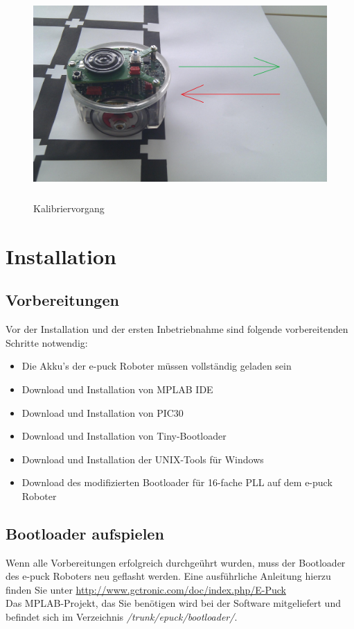 \documentclass[10pt,a4paper]{article}
\let\oldsection\section
\renewcommand{\section}{\newpage \oldsection}
\begin{document}
		\vspace{30pt}
		 \begin{figure}[htbp]
			\includegraphics[height=8cm]{images/puck3klein} 
			\caption{Kalibriervorgang}
			\label{kalibrierabbildung}
		\end{figure}
\section{Installation}
			\subsection{Vorbereitungen} 
			Vor der Installation und der ersten Inbetriebnahme sind folgende vorbereitenden Schritte notwendig:
			\begin{itemize}
				\item{Die Akku's der e-puck Roboter m\"ussen vollst\"andig geladen sein}
				\item{Download und Installation von MPLAB IDE}
				\item{Download und Installation von PIC30}
				\item{Download und Installation von Tiny-Bootloader}
				\item{Download und Installation der UNIX-Tools f\"ur Windows}
				\item{Download des modifizierten Bootloader f\"ur 16-fache PLL auf dem e-puck Roboter}
			\end{itemize}
			\subsection{Bootloader aufspielen} 
				Wenn alle Vorbereitungen erfolgreich durchge\"uhrt wurden, muss der Bootloader des e-puck Roboters neu geflasht werden. Eine ausf\"uhrliche
				Anleitung hierzu finden Sie unter \url{http://www.gctronic.com/doc/index.php/E-Puck} \\
				Das MPLAB-Projekt, das Sie ben\"otigen wird bei der Software mitgeliefert und befindet sich im Verzeichnis \textit{/trunk/epuck/bootloader/}.
\end{document}
